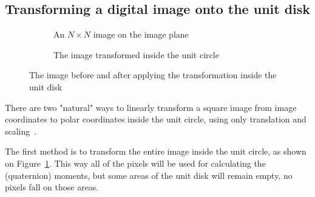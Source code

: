 \subsection{Transforming a digital image onto the unit disk}
\begin{figure}[tb]
    \begin{subfigure}{.43\textwidth}
    \centering
    \caption{An $N \times N$ image on the image plane}
    \end{subfigure}
    \begin{subfigure}{.05\textwidth}
      \centering
    \end{subfigure}
    \begin{subfigure}{.50\textwidth}
      \centering
      \caption{The image transformed inside the unit circle}
      \end{subfigure}
    \caption{The image before and after applying the transformation inside the unit disk}
    \label{fig:transform1}
\end{figure}

There are two "natural" ways to linearly transform a square image from image coordinates to polar coordinates inside the unit circle, using only translation and scaling~\cite{kintner}.

The first method is to transform the entire image inside the unit circle, as shown on Figure~\ref{fig:transform1}. This way all of the pixels will be used for calculating the (quaternion) moments, but some areas of the unit disk will remain empty, no pixels fall on those areas.

